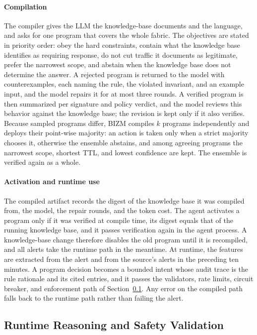 \documentclass[final,5p]{elsarticle}
\begin{document}
\paragraph{Compilation}
The compiler gives the LLM the knowledge-base documents and the language, and asks for one program that covers the whole fabric. The objectives are stated in priority order: obey the hard constraints, contain what the knowledge base identifies as requiring response, do not cut traffic it documents as legitimate, prefer the narrowest scope, and abstain when the knowledge base does not determine the answer. A rejected program is returned to the model with counterexamples, each naming the rule, the violated invariant, and an example input, and the model repairs it for at most three rounds. A verified program is then summarized per signature and policy verdict, and the model reviews this behavior against the knowledge base; the revision is kept only if it also verifies. Because sampled programs differ, BIZM compiles $k$ programs independently and deploys their point-wise majority: an action is taken only when a strict majority chooses it, otherwise the ensemble abstains, and among agreeing programs the narrowest scope, shortest TTL, and lowest confidence are kept. The ensemble is verified again as a whole.

\paragraph{Activation and runtime use}
The compiled artifact records the digest of the knowledge base it was compiled from, the model, the repair rounds, and the token cost. The agent activates a program only if it was verified at compile time, its digest equals that of the running knowledge base, and it passes verification again in the agent process. A knowledge-base change therefore disables the old program until it is recompiled, and all alerts take the runtime path in the meantime. At runtime, the features are extracted from the alert and from the source's alerts in the preceding ten minutes. A program decision becomes a bounded intent whose audit trace is the rule rationale and its cited entries, and it passes the validators, rate limits, circuit breaker, and enforcement path of Section~\ref{sec:decision_safety}. Any error on the compiled path falls back to the runtime path rather than failing the alert.

\subsection{Runtime Reasoning and Safety Validation}
\label{sec:decision_safety}
\end{document}
